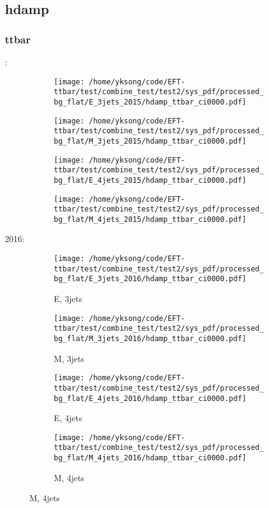 \documentclass{beamer}
\begin{document}
\subsection{hdamp}

\begin{frame}
\frametitle{ttbar}
\fontsize{5}{1}:
\begin{figure}
\centering
\begin{subfigure}[b]{0.24\textwidth}
\texttt{[image: /home/yksong/code/EFT-ttbar/test/combine\_test/test2/sys\_pdf/processed\_bg\_flat/E\_3jets\_2015/hdamp\_ttbar\_ci0000.pdf]}
\end{subfigure}
\begin{subfigure}[b]{0.24\textwidth}
\texttt{[image: /home/yksong/code/EFT-ttbar/test/combine\_test/test2/sys\_pdf/processed\_bg\_flat/M\_3jets\_2015/hdamp\_ttbar\_ci0000.pdf]}
\end{subfigure}
\begin{subfigure}[b]{0.24\textwidth}
\texttt{[image: /home/yksong/code/EFT-ttbar/test/combine\_test/test2/sys\_pdf/processed\_bg\_flat/E\_4jets\_2015/hdamp\_ttbar\_ci0000.pdf]}
\end{subfigure}
\begin{subfigure}[b]{0.24\textwidth}
\texttt{[image: /home/yksong/code/EFT-ttbar/test/combine\_test/test2/sys\_pdf/processed\_bg\_flat/M\_4jets\_2015/hdamp\_ttbar\_ci0000.pdf]}
\end{subfigure}
\end{figure}
2016:
\begin{figure}
\centering
\begin{subfigure}[b]{0.24\textwidth}
\texttt{[image: /home/yksong/code/EFT-ttbar/test/combine\_test/test2/sys\_pdf/processed\_bg\_flat/E\_3jets\_2016/hdamp\_ttbar\_ci0000.pdf]}
\captionsetup{font=tiny}
\caption{E, 3jets}
\end{subfigure}
\begin{subfigure}[b]{0.24\textwidth}
\texttt{[image: /home/yksong/code/EFT-ttbar/test/combine\_test/test2/sys\_pdf/processed\_bg\_flat/M\_3jets\_2016/hdamp\_ttbar\_ci0000.pdf]}
\captionsetup{font=tiny}
\caption{M, 3jets}
\end{subfigure}
\begin{subfigure}[b]{0.24\textwidth}
\texttt{[image: /home/yksong/code/EFT-ttbar/test/combine\_test/test2/sys\_pdf/processed\_bg\_flat/E\_4jets\_2016/hdamp\_ttbar\_ci0000.pdf]}
\captionsetup{font=tiny}
\caption{E, 4jets}
\end{subfigure}
\begin{subfigure}[b]{0.24\textwidth}
\texttt{[image: /home/yksong/code/EFT-ttbar/test/combine\_test/test2/sys\_pdf/processed\_bg\_flat/M\_4jets\_2016/hdamp\_ttbar\_ci0000.pdf]}
\captionsetup{font=tiny}
\caption{M, 4jets}
\end{subfigure}
\end{figure}
\end{frame}
\end{document}
